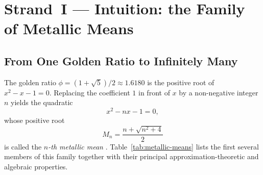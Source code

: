 \section{Strand~I — Intuition: the Family of Metallic Means}
\label{sec:metallic-family}

\subsection{From One Golden Ratio to Infinitely Many}
\label{subsec:from-phi-to-family}

The golden ratio $\phi = (1+\sqrt{5})/2 \approx 1.6180$
is the positive root of $x^2 - x - 1 = 0$.
Replacing the coefficient $1$ in front of $x$ by
a non-negative integer $n$ yields the quadratic
\begin{equation}\label{eq:metallic-quadratic}
  x^2 - nx - 1 = 0,
\end{equation}
whose positive root
\begin{equation}\label{eq:metallic-mean-def}
  M_n = \frac{n + \sqrt{n^2+4}}{2}
\end{equation}
is called the \emph{$n$-th metallic mean}
\cite{spinadel_metallic}.
Table~\ref{tab:metallic-means} lists the first
several members of this family together with their
principal approximation-theoretic and algebraic
properties.

\begin{table}[H]
\centering
\caption{The family of metallic means $M_n = (n+\sqrt{n^2+4})/2$.}
\label{tab:metallic-means}
\end{table}

